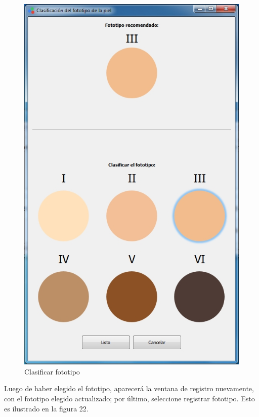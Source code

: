 		
\begin{figure}[H]
  \centering
  \includegraphics[width=.7\linewidth]{./img/fototipo.jpg}
\caption{Clasificar fototipo}
\end{figure}

	Luego de haber elegido el fototipo, aparecer\'{a} la ventana de registro nuevamente, con el fototipo elegido actualizado; por \'{u}ltimo, seleccione registrar fototipo. Esto es ilustrado en la figura 22.

